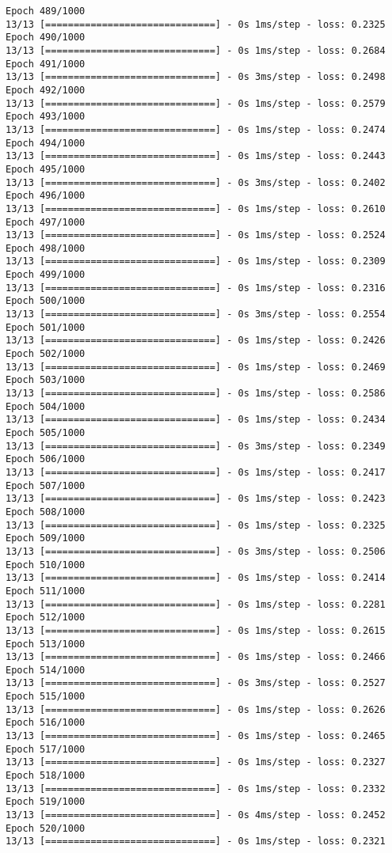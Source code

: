 \documentclass[11pt]{article}
\begin{document}
\begin{Verbatim}[commandchars=\\\{\}]
Epoch 489/1000
13/13 [==============================] - 0s 1ms/step - loss: 0.2325
Epoch 490/1000
13/13 [==============================] - 0s 1ms/step - loss: 0.2684
Epoch 491/1000
13/13 [==============================] - 0s 3ms/step - loss: 0.2498
Epoch 492/1000
13/13 [==============================] - 0s 1ms/step - loss: 0.2579
Epoch 493/1000
13/13 [==============================] - 0s 1ms/step - loss: 0.2474
Epoch 494/1000
13/13 [==============================] - 0s 1ms/step - loss: 0.2443
Epoch 495/1000
13/13 [==============================] - 0s 3ms/step - loss: 0.2402
Epoch 496/1000
13/13 [==============================] - 0s 1ms/step - loss: 0.2610
Epoch 497/1000
13/13 [==============================] - 0s 1ms/step - loss: 0.2524
Epoch 498/1000
13/13 [==============================] - 0s 1ms/step - loss: 0.2309
Epoch 499/1000
13/13 [==============================] - 0s 1ms/step - loss: 0.2316
Epoch 500/1000
13/13 [==============================] - 0s 3ms/step - loss: 0.2554
Epoch 501/1000
13/13 [==============================] - 0s 1ms/step - loss: 0.2426
Epoch 502/1000
13/13 [==============================] - 0s 1ms/step - loss: 0.2469
Epoch 503/1000
13/13 [==============================] - 0s 1ms/step - loss: 0.2586
Epoch 504/1000
13/13 [==============================] - 0s 1ms/step - loss: 0.2434
Epoch 505/1000
13/13 [==============================] - 0s 3ms/step - loss: 0.2349
Epoch 506/1000
13/13 [==============================] - 0s 1ms/step - loss: 0.2417
Epoch 507/1000
13/13 [==============================] - 0s 1ms/step - loss: 0.2423
Epoch 508/1000
13/13 [==============================] - 0s 1ms/step - loss: 0.2325
Epoch 509/1000
13/13 [==============================] - 0s 3ms/step - loss: 0.2506
Epoch 510/1000
13/13 [==============================] - 0s 1ms/step - loss: 0.2414
Epoch 511/1000
13/13 [==============================] - 0s 1ms/step - loss: 0.2281
Epoch 512/1000
13/13 [==============================] - 0s 1ms/step - loss: 0.2615
Epoch 513/1000
13/13 [==============================] - 0s 1ms/step - loss: 0.2466
Epoch 514/1000
13/13 [==============================] - 0s 3ms/step - loss: 0.2527
Epoch 515/1000
13/13 [==============================] - 0s 1ms/step - loss: 0.2626
Epoch 516/1000
13/13 [==============================] - 0s 1ms/step - loss: 0.2465
Epoch 517/1000
13/13 [==============================] - 0s 1ms/step - loss: 0.2327
Epoch 518/1000
13/13 [==============================] - 0s 1ms/step - loss: 0.2332
Epoch 519/1000
13/13 [==============================] - 0s 4ms/step - loss: 0.2452
Epoch 520/1000
13/13 [==============================] - 0s 1ms/step - loss: 0.2321

\end{Verbatim}
\end{document}
